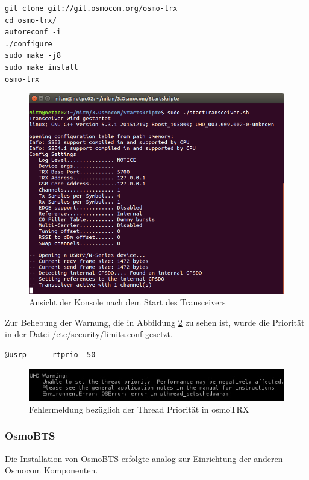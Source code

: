 \begin{lstlisting}
git clone git://git.osmocom.org/osmo-trx
cd osmo-trx/
autoreconf -i
./configure
sudo make -j8
sudo make install
osmo-trx	
\end{lstlisting}

\begin{figure}[h] %
\centering
\includegraphics[width=15cm]{includes/Start_Transceiver}
\caption{Ansicht der Konsole nach dem Start des Transceivers}
\label{fig:Transceiver}
\end{figure}

Zur Behebung der Warnung, die in Abbildung \ref{fig:UHDWarnung} zu sehen ist, wurde die Priorität in der Datei /etc/security/limits.conf gesetzt.

\begin{lstlisting}
@usrp   -  rtprio  50
\end{lstlisting}

\begin{figure}[h] %
\centering
\includegraphics[width=15cm]{includes/uhd_usrp_warnung}
\caption{Fehlermeldung bezüglich der Thread Priorität in osmoTRX}
\label{fig:UHDWarnung}
\end{figure}

\subsubsection{OsmoBTS}
Die Installation von OsmoBTS erfolgte analog zur Einrichtung der anderen Osmocom Komponenten.

